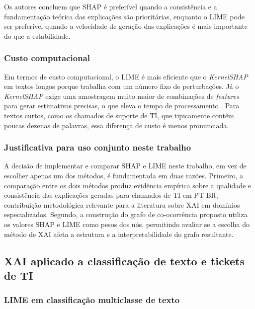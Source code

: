 \documentclass[
    12pt,                %
    openright,           %
    oneside,             %
    a4paper,             %
    english,             %
    brazil               %
]{abntex2}
\begin{document}
Os autores concluem que SHAP é preferível quando a consistência e a fundamentação teórica das explicações são prioritárias, enquanto o LIME pode ser preferível quando a velocidade de geração das explicações é mais importante do que a estabilidade.

\subsubsection{Custo computacional}
\label{subsubsec:comparacao_custo}

Em termos de custo computacional, o LIME é mais eficiente que o 
\textit{KernelSHAP} em textos longos porque trabalha com um número 
fixo de perturbações. Já o \textit{KernelSHAP} exige uma amostragem 
muito maior de combinações de \textit{features} para gerar estimativas 
precisas, o que eleva o tempo de processamento \cite{salih2023}. 
Para textos curtos, como os chamados de suporte de TI, que tipicamente 
contêm poucas dezenas de palavras, essa diferença de custo é menos 
pronunciada.
\subsubsection{Justificativa para uso conjunto neste trabalho}
\label{subsubsec:comparacao_justificativa}

A decisão de implementar e comparar SHAP e LIME neste trabalho, em vez de escolher apenas um dos métodos, é fundamentada em duas razões. Primeiro, a comparação entre os dois métodos produz evidência empírica sobre a qualidade e consistência das explicações geradas para chamados de TI em PT-BR, contribuição metodológica relevante para a literatura sobre XAI em domínios especializados. Segundo, a construção do grafo de co-ocorrência proposto utiliza os 
valores SHAP e LIME como pesos dos nós, permitindo avaliar 
se a escolha do método de XAI afeta a estrutura e a 
interpretabilidade do grafo resultante.

\subsection{XAI aplicado a classificação de texto e tickets de TI}
\label{subsec:xai_aplicado}

\subsubsection{LIME em classificação multiclasse de texto}
\label{subsubsec:xai_mustafa}
\end{document}

